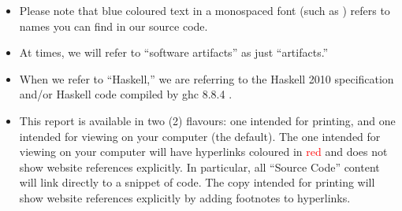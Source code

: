 \begin{itemize}
            \sourceCodeBlobHashesTable{}

      \item Please note that blue coloured text in a monospaced font (such as
            \ExampleText{}) refers to names you can find in our source code.

      \item At times, we will refer to ``software artifacts'' as just
            ``artifacts.''

      \item When we refer to ``Haskell,'' we are referring to the Haskell 2010
            specification \cite{Haskell2010} and/or Haskell code compiled by
            \acs{ghc} 8.8.4 \cite{GHC884}.

      \item This report is available in two (2) flavours: one intended for
            printing, and one intended for viewing on your computer (the
            default). The one intended for viewing on your computer will have
            hyperlinks coloured in \textcolor{red}{red} and does not show
            website references explicitly. In particular, all ``Source Code''
            content will link directly to a snippet of code. The copy intended
            for printing will show website references explicitly by adding
            footnotes to hyperlinks.

\end{itemize}
